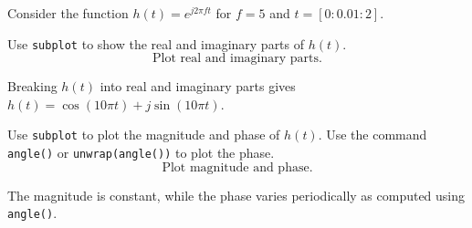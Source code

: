 \documentclass{ximera}
\author{Jont Allen}
\begin{document}
\begin{problem}
    Consider the function \(h(t) = e^{j2\pi ft}\) for \(f = 5\) and \(t = [0:0.01:2]\).
    
    Use \texttt{subplot} to show the real and imaginary parts of \(h(t)\).
    \[
    \text{Plot real and imaginary parts.}
    \]
    \begin{feedback}[correct]
    Breaking \(h(t)\) into real and imaginary parts gives \(h(t) = \cos(10\pi t) + j\sin(10\pi t)\).
    \end{feedback}
\end{problem}

\begin{problem}
    Use \texttt{subplot} to plot the magnitude and phase of \(h(t)\).
    Use the command \texttt{angle()} or \texttt{unwrap(angle())} to plot the phase.
    \[
    \text{Plot magnitude and phase.}
    \]
    \begin{feedback}[correct]
    The magnitude is constant, while the phase varies periodically as computed using \texttt{angle()}.
    \end{feedback}
\end{problem}
\end{document}
